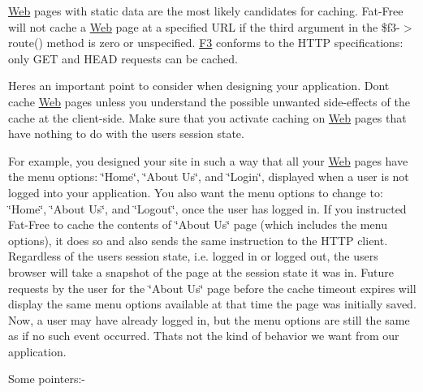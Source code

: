 \hyperlink{class_web}{Web} pages with static data are the most likely candidates for caching. Fat-\/\+Free will not cache a \hyperlink{class_web}{Web} page at a specified U\+RL if the third argument in the {\ttfamily \$f3-\/$>$route()} method is zero or unspecified. \hyperlink{class_f3}{F3} conforms to the H\+T\+TP specifications\+: only G\+ET and H\+E\+AD requests can be cached.

Here\textquotesingle{}s an important point to consider when designing your application. Don\textquotesingle{}t cache \hyperlink{class_web}{Web} pages unless you understand the possible unwanted side-\/effects of the cache at the client-\/side. Make sure that you activate caching on \hyperlink{class_web}{Web} pages that have nothing to do with the user\textquotesingle{}s session state.

For example, you designed your site in such a way that all your \hyperlink{class_web}{Web} pages have the menu options\+: {\ttfamily \char`\"{}\+Home\char`\"{}}, {\ttfamily \char`\"{}\+About Us\char`\"{}}, and {\ttfamily \char`\"{}\+Login\char`\"{}}, displayed when a user is not logged into your application. You also want the menu options to change to\+: {\ttfamily \char`\"{}\+Home\char`\"{}}, {\ttfamily \char`\"{}\+About Us\char`\"{}}, and {\ttfamily \char`\"{}\+Logout\char`\"{}}, once the user has logged in. If you instructed Fat-\/\+Free to cache the contents of {\ttfamily \char`\"{}\+About Us\char`\"{}} page (which includes the menu options), it does so and also sends the same instruction to the H\+T\+TP client. Regardless of the user\textquotesingle{}s session state, i.\+e. logged in or logged out, the user\textquotesingle{}s browser will take a snapshot of the page at the session state it was in. Future requests by the user for the {\ttfamily \char`\"{}\+About Us\char`\"{}} page before the cache timeout expires will display the same menu options available at that time the page was initially saved. Now, a user may have already logged in, but the menu options are still the same as if no such event occurred. That\textquotesingle{}s not the kind of behavior we want from our application.

Some pointers\+:-\/


